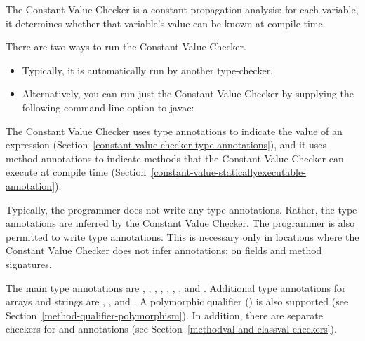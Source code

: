 
The Constant Value Checker is a constant propagation analysis: for
each variable, it determines whether that variable's value can be
known at compile time.

There are two ways to run the Constant Value Checker.
\begin{itemize}
\item
Typically, it is automatically run by another type-checker.
\item
Alternatively, you can run just the Constant Value Checker by
supplying the following command-line option to javac:
\end{itemize}



The Constant Value Checker uses type annotations to indicate the value of
an expression (Section~\ref{constant-value-checker-type-annotations}), and
it uses method annotations to indicate methods that the Constant Value
Checker can execute at compile time
(Section~\ref{constant-value-staticallyexecutable-annotation}).



Typically, the programmer does not write any type annotations.  Rather, the
type annotations are inferred by the Constant Value Checker.
The programmer is also permitted to write type annotations.  This is necessary only in
locations where the Constant Value Checker does not infer annotations:  on fields
and method signatures.

The main type annotations are
,
,
,
,
,
,
,
and .
Additional type annotations for arrays and strings are
,
,
and .
A polymorphic qualifier ()
is also supported (see Section~\ref{method-qualifier-polymorphism}).
In addition, there are separate checkers for
 and
 annotations
(see Section~\ref{methodval-and-classval-checkers}).

